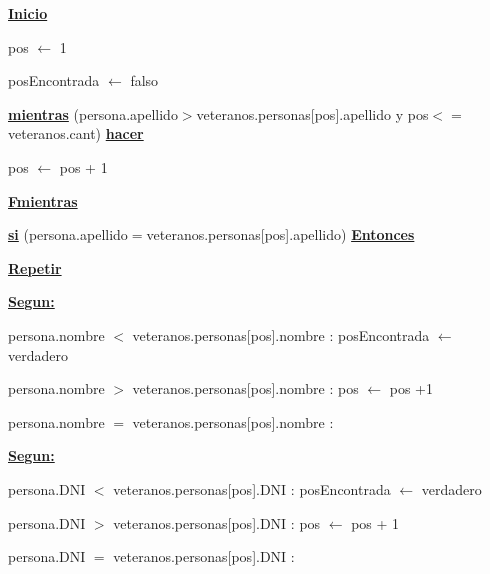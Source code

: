 \documentclass{article}
\begin{document}
        \hspace{8mm}\underline{\textbf{Inicio}}

            \hspace{12mm}pos $\leftarrow$ 1

            \hspace{12mm}posEncontrada $\leftarrow$ falso

            \hspace{12mm}\underline{\textbf{mientras}} (persona.apellido$>$veteranos.personas[pos].apellido
            y pos$<=$veteranos.cant) \underline{\textbf{hacer}}

                \hspace{16mm}pos $\leftarrow$ pos + 1

            \hspace{12mm}\underline{\textbf{Fmientras}}

            \hspace{12mm}\underline{\textbf{si}} (persona.apellido$=$veteranos.personas[pos].apellido) \underline{\textbf{Entonces}}

                \hspace{16mm}\underline{\textbf{Repetir}}

                    \hspace{20mm}\underline{\textbf{Segun:}} 

                        \hspace{24mm} persona.nombre $<$ veteranos.personas[pos].nombre : posEncontrada $\leftarrow$ verdadero

                        \hspace{24mm} persona.nombre $>$ veteranos.personas[pos].nombre : pos $\leftarrow$ pos +1

                        \hspace{24mm} persona.nombre $=$ veteranos.personas[pos].nombre :

                            \hspace{28mm} \underline{\textbf{Segun:}}

                                \hspace{32mm} persona.DNI $<$ veteranos.personas[pos].DNI : posEncontrada $\leftarrow$ verdadero

                                \hspace{32mm} persona.DNI $>$ veteranos.personas[pos].DNI : pos $\leftarrow$ pos + 1

                                \hspace{32mm} persona.DNI $=$ veteranos.personas[pos].DNI : 
\end{document}
